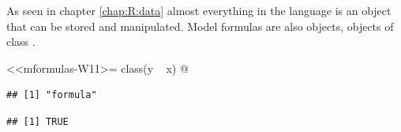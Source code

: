 \documentclass[krantz2]{krantz}\usepackage{knitr}%
\begin{document}
As seen in chapter \ref{chap:R:data} almost everything in the \Rlang language is an object that can be stored and manipulated. Model formulas are also objects, objects of class .

<<mformulas-W11>=
class(y ~ x)
@

\begin{knitrout}\footnotesize
{}\color{fgcolor}\begin{kframe}
\begin{alltt}
 \hlkwb{<-}  \hlopt{~} 
\end{alltt}
\begin{verbatim}
## [1] "formula"
\end{verbatim}
\begin{alltt}
 \hlstd{)}
\end{alltt}
\begin{verbatim}
## [1] TRUE
\end{verbatim}
\end{kframe}
\end{knitrout}
\end{document}
